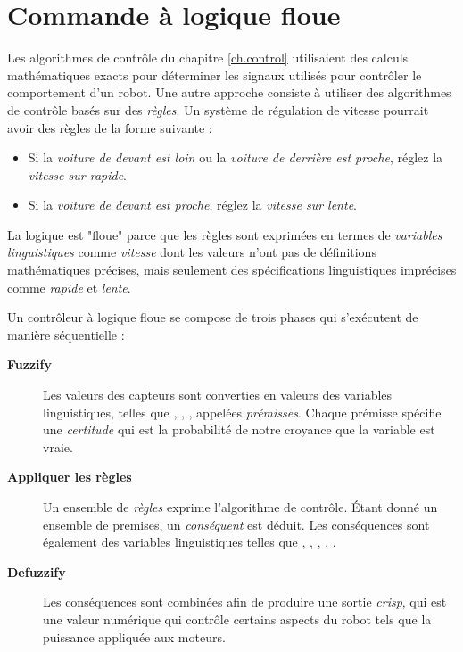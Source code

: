 
\chapter{Commande à logique floue}\label{ch.fuzzy}

Les algorithmes de contrôle du chapitre \ref{ch.control} utilisaient des calculs mathématiques exacts pour déterminer les signaux utilisés pour contrôler le comportement d'un robot. Une autre approche consiste à utiliser des algorithmes de contrôle basés sur des \emph{règles}. Un système de régulation de vitesse pourrait avoir des règles de la forme suivante :
\begin{itemize}
\item Si la \emph{voiture de devant est loin} ou la \emph{voiture de derrière est proche}, réglez la \emph{vitesse sur rapide}.
\item Si la \emph{voiture de devant est proche}, réglez la \emph{vitesse sur lente}.
\end{itemize}
La logique est "floue" parce que les règles sont exprimées en termes de \emph{variables linguistiques} comme \emph{vitesse} dont les valeurs n'ont pas de définitions mathématiques précises, mais seulement des spécifications linguistiques imprécises comme \emph{rapide} et \emph{lente}.

Un contrôleur à logique floue se compose de trois phases qui s'exécutent de manière séquentielle :
\begin{description}
\item[\textbf{Fuzzify}] Les valeurs des capteurs sont converties en valeurs des variables linguistiques, telles que , , , appelées \emph{prémisses}. Chaque prémisse spécifie une \emph{certitude} qui est la probabilité de notre croyance que la variable est vraie.
\item[\textbf{Appliquer les règles}] Un ensemble de \emph{règles} exprime l'algorithme de contrôle. Étant donné un ensemble de prem\-ises, un \emph{conséquent} est déduit. Les conséquences sont également des variables linguistiques telles que , , , , .
\item[\textbf{Defuzzify}] Les conséquences sont combinées afin de produire une sortie \emph{crisp}, qui est une valeur numérique qui contrôle certains aspects du robot tels que la puissance appliquée aux moteurs.
\end{description}

